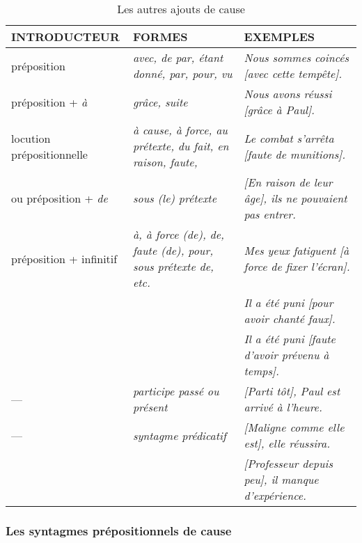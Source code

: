 \documentclass[UTF8]{report}
\begin{document}
\begin{table}[H]
    \centering 

    \begin{adjustbox}{max width =\textwidth}
        \begin{tabular}{|l|l|l|}
        \hline
        \rowcolor{cyan!20}
        \textbf{INTRODUCTEUR} & \textbf{FORMES} & \textbf{EXEMPLES} \\
        \hline
        préposition & \textit{avec, de par, étant donné, par, pour, vu} & \textit{Nous sommes coincés [avec cette tempête].} \\
        \hline
        préposition + \textit{à} & \textit{grâce, suite} & \textit{Nous avons réussi [grâce à Paul].} \\
        \hline
        locution prépositionnelle & \textit{à cause, à force, au prétexte, du fait, en raison, faute,} & \textit{Le combat s'arrêta [faute de munitions].} \\
        ou préposition + \textit{de} & \textit{sous (le) prétexte} & \textit{[En raison de leur âge], ils ne pouvaient pas entrer.} \\
        \hline
        préposition + infinitif & \textit{à, à force (de), de, faute (de), pour, sous prétexte de, etc.} & \textit{Mes yeux fatiguent [à force de fixer l'écran].} \\
        & & \textit{Il a été puni [pour avoir chanté faux].} \\
        & & \textit{Il a été puni [faute d'avoir prévenu à temps].} \\
        \hline
        --- & \textit{participe passé ou présent} & \textit{[Parti tôt], Paul est arrivé à l'heure.} \\
        \hline
        --- & \textit{syntagme prédicatif} & \textit{[Maligne comme elle est], elle réussira.} \\
        & & \textit{[Professeur depuis peu], il manque d'expérience.} \\
        \hline
        \end{tabular}
    \end{adjustbox}
    \caption{Les autres ajouts de cause}
\end{table}

\subsubsection{Les syntagmes prépositionnels de cause}
\end{document}
